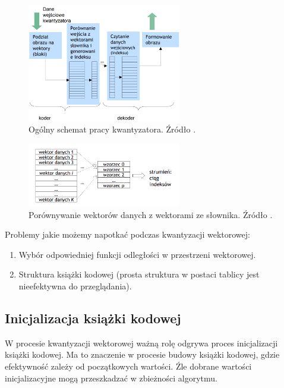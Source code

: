 \documentclass{article}
\begin{document}
\begin{figure}[H]
    \centering
    \includegraphics[width=0.6\textwidth]{images/schemat_kwantyzatora.png}
    \caption{Ogólny schemat pracy kwantyzatora. Źródło \cite{mwilczewski}.}
    \label{fig:schemat_kwantyzatora}
\end{figure}

\begin{figure}[H]
    \centering
    \includegraphics[width=0.6\textwidth]{images/wektory_danych.png}
    \caption{Porównywanie wektorów danych z wektorami ze słownika. Źródło \cite{mwilczewski}.}
    \label{fig:wektory_danych}
\end{figure}

Problemy jakie możemy napotkać podczas kwantyzacji wektorowej:
\begin{enumerate}
  \item Wybór odpowiedniej funkcji odległości w przestrzeni wektorowej.  
  \item Struktura książki kodowej (prosta struktura w postaci tablicy jest nieefektywna do przeglądania).
\end{enumerate}

\subsection{Inicjalizacja książki kodowej}

W procesie kwantyzacji wektorowej ważną rolę odgrywa proces inicjalizacji książki kodowej.
Ma to znaczenie w procesie budowy książki kodowej, gdzie efektywność zależy od początkowych wartości.
Źle dobrane wartości inicjalizacyjne mogą przeszkadzać w zbieżności algorytmu.
\end{document}
